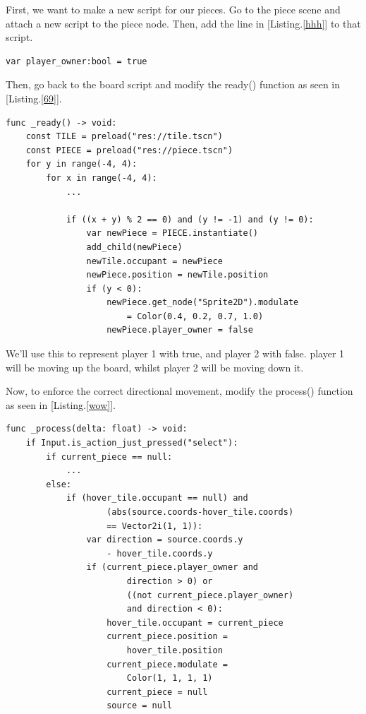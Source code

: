 \documentclass[14pt]{extarticle}
\newcommand{\prettyref}[2]{[{#1}.\ref{#2}]}
\begin{document}
First, we want to make a new script for our pieces. Go to the piece scene and attach a new script to the piece node. Then, add the line in \prettyref{Listing}{hhh} to that script.

\begin{lstlisting}[language=gdscript, label={hhh}, caption=New Piece script]
var player_owner:bool = true
\end{lstlisting}

Then, go back to the board script and modify the ready() function as seen in \prettyref{Listing}{69}.

\begin{lstlisting}[language=gdscript, label={69}, caption=Setting ownership]
func _ready() -> void:
	const TILE = preload("res://tile.tscn")
	const PIECE = preload("res://piece.tscn")
	for y in range(-4, 4):
		for x in range(-4, 4):
			...
			
			if ((x + y) % 2 == 0) and (y != -1) and (y != 0):
				var newPiece = PIECE.instantiate()
				add_child(newPiece)
				newTile.occupant = newPiece
				newPiece.position = newTile.position
				if (y < 0):
					newPiece.get_node("Sprite2D").modulate
                        = Color(0.4, 0.2, 0.7, 1.0)
					newPiece.player_owner = false
\end{lstlisting}

We'll use this to represent player 1 with true, and player 2 with false. player 1 will be moving up the board, whilst player 2 will be moving down it.

Now, to enforce the correct directional movement, modify the process() function as seen in \prettyref{Listing}{wow}.

\begin{lstlisting}[language=gdscript, label={wow}, caption=Forcing correct direction]
func _process(delta: float) -> void:
	if Input.is_action_just_pressed("select"):
		if current_piece == null:
			...
		else:
			if (hover_tile.occupant == null) and
                    (abs(source.coords-hover_tile.coords)
                    == Vector2i(1, 1)):
				var direction = source.coords.y
                    - hover_tile.coords.y
				if (current_piece.player_owner and
                        direction > 0) or
                        ((not current_piece.player_owner)
                        and direction < 0):
					hover_tile.occupant = current_piece
					current_piece.position =
                        hover_tile.position
					current_piece.modulate =
                        Color(1, 1, 1, 1)
					current_piece = null
					source = null
\end{lstlisting}
\end{document}
